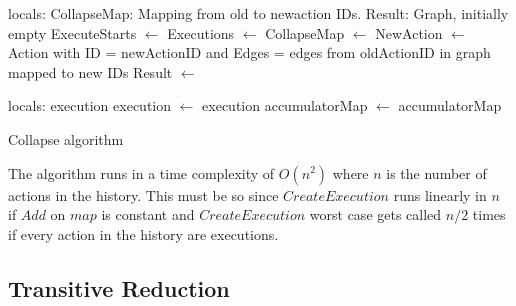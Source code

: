 	
	\begin{algorithm}[H]
		\begin{algorithmic}
			\State
				locals: CollapseMap: Mapping from old to newaction IDs.
				\State\hspace{28pt} Result: Graph, initially empty
				\State
				\State ExecuteStarts $\leftarrow$  \State
				Executions $\leftarrow$ 
				\State
					CollapseMap $\leftarrow$ 
				\EndFor
					\State
					NewAction $\leftarrow$ Action with \State\hspace{28pt}ID = newActionID and \State\hspace{28pt}Edges = edges from oldActionID in graph mapped to new IDs\State
					Result $\leftarrow$  \State{}
				\EndFor
				
			\EndFunction
			\State
				\State locals: execution
				 \State
					execution $\leftarrow$ 
				\EndWhile\State
				\Return execution
			\EndFunction
			\State
				\State
					accumulatorMap $\leftarrow$ 
				\EndFor \State
				\Return accumulatorMap
			\EndFunction
		\end{algorithmic}
		\caption{Collapse algorithm}
		\label{alg:collapse}
	\end{algorithm}
	
	\newpar The algorithm runs in a time complexity of $O(n^2)$ where $n$ is the number of actions in the history. This must be so since $CreateExecution$ runs linearly in $n$ if $Add$ on $map$ is constant and $CreateExecution$ worst case gets called $n/2$ times if every action in the history are executions. 
	
	\subsection{Transitive Reduction}
	
